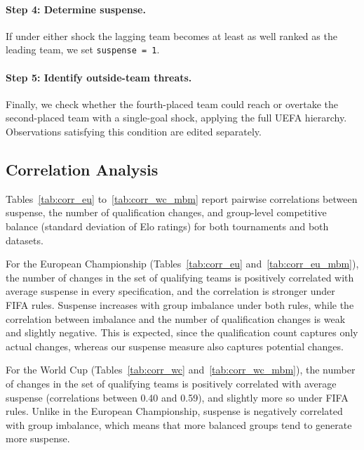\documentclass[11pt]{article}
\begin{document}
\paragraph{Step 4: Determine suspense.}
If under either shock the lagging team becomes at least as well ranked as the leading team, we set \texttt{suspense = 1}.

\paragraph{Step 5: Identify outside-team threats.}
Finally, we check whether the fourth-placed team could reach or overtake the second-placed team with a single-goal shock, applying the full UEFA hierarchy. Observations satisfying this condition are edited separately.


\subsection{Correlation Analysis}
\label{app:correlations}

Tables~\ref{tab:corr_eu} to~\ref{tab:corr_wc_mbm} report pairwise correlations between suspense, the number of qualification changes, and group-level competitive balance (standard deviation of Elo ratings) for both tournaments and both datasets.

For the European Championship (Tables~\ref{tab:corr_eu} and~\ref{tab:corr_eu_mbm}), the number of changes in the set of qualifying teams is positively correlated with average suspense in every specification, and the correlation is stronger under FIFA rules. Suspense increases with group imbalance under both rules, while the correlation between imbalance and the number of qualification changes is weak and slightly negative. This is expected, since the qualification count captures only actual changes, whereas our suspense measure also captures potential changes.




For the World Cup (Tables~\ref{tab:corr_wc} and~\ref{tab:corr_wc_mbm}), the number of changes in the set of qualifying teams is positively correlated with average suspense (correlations between 0.40 and 0.59), and slightly more so under FIFA rules. Unlike in the European Championship, suspense is negatively correlated with group imbalance, which means that more balanced groups tend to generate more suspense.



\end{document}

